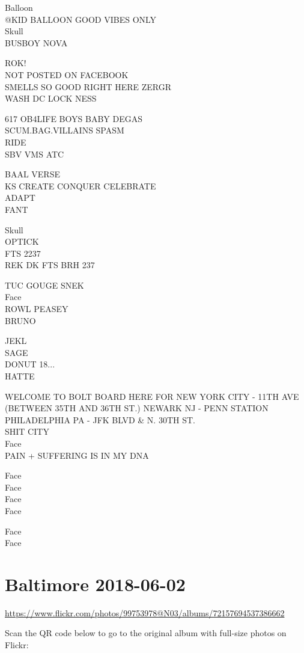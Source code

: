 \documentclass[10pt,letterpaper]{article}
\begin{document}
Balloon\\
@KID BALLOON GOOD VIBES ONLY\\
Skull\\
BUSBOY NOVA

ROK!\\
NOT POSTED ON FACEBOOK\\
SMELLS SO GOOD RIGHT HERE ZERGR\\
WASH DC LOCK NESS

617 OB4LIFE BOYS BABY DEGAS\\
SCUM.BAG.VILLAINS SPASM\\
RIDE\\
SBV VMS ATC

BAAL VERSE\\
KS CREATE CONQUER CELEBRATE\\
ADAPT\\
FANT

Skull\\
OPTICK\\
FTS 2237\\
REK DK FTS BRH 237

TUC GOUGE SNEK\\
Face\\
ROWL PEASEY\\
BRUNO

JEKL\\
SAGE\\
DONUT 18...\\
HATTE

WELCOME TO BOLT BOARD HERE FOR NEW YORK CITY {-} 11TH AVE (BETWEEN 35TH AND 36TH ST.) NEWARK NJ {-} PENN STATION PHILADELPHIA PA {-} JFK BLVD \& N. 30TH ST.\\
SHIT CITY\\
Face\\
PAIN + SUFFERING IS IN MY DNA

Face\\
Face\\
Face\\
Face

Face\\
Face


\section*{Baltimore 2018-06-02}

\url{https://www.flickr.com/photos/99753978@N03/albums/72157694537386662}

Scan the QR code below to go to the original album with full-size photos on Flickr:
\end{document}
